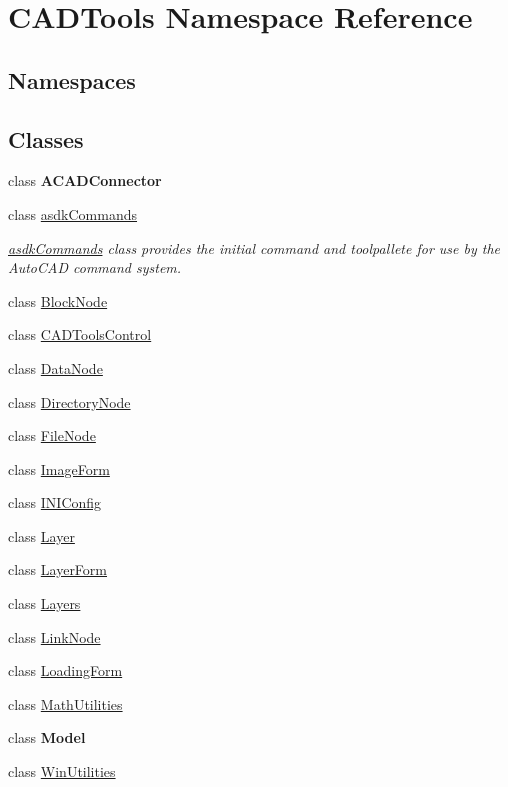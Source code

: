 \hypertarget{namespace_c_a_d_tools}{}\section{C\+A\+D\+Tools Namespace Reference}
\label{namespace_c_a_d_tools}
\subsection*{Namespaces}
\begin{DoxyCompactItemize}
\end{DoxyCompactItemize}
\subsection*{Classes}
\begin{DoxyCompactItemize}
\item 
class {\bfseries A\+C\+A\+D\+Connector}
\item 
class \mbox{\hyperlink{class_c_a_d_tools_1_1asdk_commands}{asdk\+Commands}}
\begin{DoxyCompactList}\small\item\em \mbox{\hyperlink{class_c_a_d_tools_1_1asdk_commands}{asdk\+Commands}} class provides the initial command and toolpallete for use by the Auto\+C\+AD command system. \end{DoxyCompactList}\item 
class \mbox{\hyperlink{class_c_a_d_tools_1_1_block_node}{Block\+Node}}
\item 
class \mbox{\hyperlink{class_c_a_d_tools_1_1_c_a_d_tools_control}{C\+A\+D\+Tools\+Control}}
\item 
class \mbox{\hyperlink{class_c_a_d_tools_1_1_data_node}{Data\+Node}}
\item 
class \mbox{\hyperlink{class_c_a_d_tools_1_1_directory_node}{Directory\+Node}}
\item 
class \mbox{\hyperlink{class_c_a_d_tools_1_1_file_node}{File\+Node}}
\item 
class \mbox{\hyperlink{class_c_a_d_tools_1_1_image_form}{Image\+Form}}
\item 
class \mbox{\hyperlink{class_c_a_d_tools_1_1_i_n_i_config}{I\+N\+I\+Config}}
\item 
class \mbox{\hyperlink{class_c_a_d_tools_1_1_layer}{Layer}}
\item 
class \mbox{\hyperlink{class_c_a_d_tools_1_1_layer_form}{Layer\+Form}}
\item 
class \mbox{\hyperlink{class_c_a_d_tools_1_1_layers}{Layers}}
\item 
class \mbox{\hyperlink{class_c_a_d_tools_1_1_link_node}{Link\+Node}}
\item 
class \mbox{\hyperlink{class_c_a_d_tools_1_1_loading_form}{Loading\+Form}}
\item 
class \mbox{\hyperlink{class_c_a_d_tools_1_1_math_utilities}{Math\+Utilities}}
\item 
class {\bfseries Model}
\item 
class \mbox{\hyperlink{class_c_a_d_tools_1_1_win_utilities}{Win\+Utilities}}
\end{DoxyCompactItemize}
